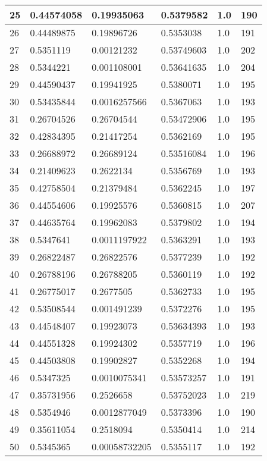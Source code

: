 \begin{longtable}{|l|l|l|l|l|l|}
25 & 0.44574058 & 0.19935063 & 0.5379582 & 1.0 & 190 \\ \hline 
26 & 0.44489875 & 0.19896726 & 0.5353038 & 1.0 & 191 \\ \hline 
27 & 0.5351119 & 0.00121232 & 0.53749603 & 1.0 & 202 \\ \hline 
28 & 0.5344221 & 0.001108001 & 0.53641635 & 1.0 & 204 \\ \hline 
29 & 0.44590437 & 0.19941925 & 0.5380071 & 1.0 & 195 \\ \hline 
30 & 0.53435844 & 0.0016257566 & 0.5367063 & 1.0 & 193 \\ \hline 
31 & 0.26704526 & 0.26704544 & 0.53472906 & 1.0 & 195 \\ \hline 
32 & 0.42834395 & 0.21417254 & 0.5362169 & 1.0 & 195 \\ \hline 
33 & 0.26688972 & 0.26689124 & 0.53516084 & 1.0 & 196 \\ \hline 
34 & 0.21409623 & 0.2622134 & 0.5356769 & 1.0 & 193 \\ \hline 
35 & 0.42758504 & 0.21379484 & 0.5362245 & 1.0 & 197 \\ \hline 
36 & 0.44554606 & 0.19925576 & 0.5360815 & 1.0 & 207 \\ \hline 
37 & 0.44635764 & 0.19962083 & 0.5379802 & 1.0 & 194 \\ \hline 
38 & 0.5347641 & 0.0011197922 & 0.5363291 & 1.0 & 193 \\ \hline 
39 & 0.26822487 & 0.26822576 & 0.5377239 & 1.0 & 192 \\ \hline 
40 & 0.26788196 & 0.26788205 & 0.5360119 & 1.0 & 192 \\ \hline 
41 & 0.26775017 & 0.2677505 & 0.5362733 & 1.0 & 195 \\ \hline 
42 & 0.53508544 & 0.001491239 & 0.5372276 & 1.0 & 195 \\ \hline 
43 & 0.44548407 & 0.19923073 & 0.53634393 & 1.0 & 193 \\ \hline 
44 & 0.44551328 & 0.19924302 & 0.5357719 & 1.0 & 196 \\ \hline 
45 & 0.44503808 & 0.19902827 & 0.5352268 & 1.0 & 194 \\ \hline 
46 & 0.5347325 & 0.0010075341 & 0.53573257 & 1.0 & 191 \\ \hline 
47 & 0.35731956 & 0.2526658 & 0.53752023 & 1.0 & 219 \\ \hline 
48 & 0.5354946 & 0.0012877049 & 0.5373396 & 1.0 & 190 \\ \hline 
49 & 0.35611054 & 0.2518094 & 0.5350414 & 1.0 & 214 \\ \hline 
50 & 0.5345365 & 0.00058732205 & 0.5355117 & 1.0 & 192 \\ \hline 
\end{longtable}